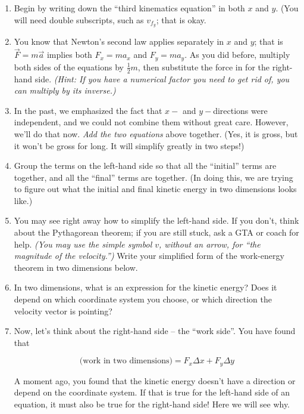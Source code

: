 \documentclass[12pt]{article}
\begin{document}
\begin{enumerate}
\item Begin by writing down the ``third kinematics equation'' in both $x$ and $y$. (You will need double subscripts, such as $v_{f_y}$; that is okay.

\item You know that Newton's second law applies separately in $x$ and $y$; that is $\vec F = m \vec a$ implies both $F_x = m a_x$ and $F_y = m a_y$. As you did before, multiply both sides of the equations by $\frac {1}{2}m$, then substitute the force in for the right-hand side. {\it (Hint: If you have a numerical factor you need to get rid of, you can multiply by its inverse.)}

\item In the past, we emphasized the fact that $x-$ and $y-$directions were independent, and we could not combine them without great care. However, we'll do that now. {\it Add the two equations} above together. (Yes, it is gross, but it won't be gross for long. It will simplify greatly in two steps!)

\item Group the terms on the left-hand side so that all the ``initial'' terms are together, and all the ``final'' terms are together. (In doing this, we are trying to figure out what the initial and final kinetic energy in two dimensions looks like.)

\item You may see right away how to simplify the left-hand side. If you don't, think about the Pythagorean theorem; if you are still stuck, ask a GTA or coach for help. {\it (You may use the simple symbol $v$, without an arrow, for ``the magnitude of the velocity.'')} Write your simplified form of the work-energy theorem in two dimensions below. 

\item In two dimensions, what is an expression for the kinetic energy? Does it depend on which coordinate system you choose, or which direction the velocity vector is pointing?

\newpage

\item Now, let's think about the right-hand side -- the ``work side''. You have found that 

$$\text{(work in two dimensions)} = F_x \Delta x + F_y \Delta y$$

A moment ago, you found that the kinetic energy doesn't have a direction or depend on the coordinate system. If that is true for the left-hand side of an equation, it must also be true for the right-hand side! Here we will see why.


\end{enumerate}
\end{document}
